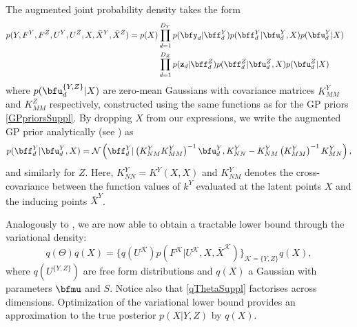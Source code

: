 
 
 The augmented joint probability density takes the form
 \begin{align}
 p(Y,F^Y, F^Z, U^Y, U^Z,X,\bar{X}^Y,\bar{X}^Z) =
    p(X) & \prod_{d=1}^{D_Y} p(\bfy_d | \bff^Y_d) p(\bff^Y_d | \bfu^Y_d, X) p(\bfu^Y_d | X)  & \nonumber \\
         & \prod_{d=1}^{D_Z} p(\mathbf{z}_d | \bff^Z_d) p(\bff^Z_d | \bfu^Z_d, X) p(\bfu^Z_d | X) \label{augmentedJointSuppl}
 \end{align}
 where $p(\bfu^{\{Y,Z\}}_d | X)$ are zero-mean Gaussians with
 covariance matrices $K^Y_{MM}$ and $K^Z_{MM}$ respectively, constructed using the same functions as for
 the GP priors \eqref{GPpriorsSuppl}. 
 By dropping $X$ from our
 expressions, we write the augmented GP prior analytically (see
 \cite{Rasmussen:book06}) as
 \begin{equation}
  \label{priorF2Suppl}
 p(\bff^Y_d | \bfu^Y_d, X) =  \mathcal{N}  \left( \bff^Y_d | \left(K^Y_{NM} K^Y_{MM}\right)^{-1}
	\bfu^Y_d , K^Y_{NN} - K^Y_{NM} \left(K^Y_{MM}\right)^{-1} K^Y_{MN} \right),
 \end{equation}
 and similarly for $Z$. Here, $K^Y_{NN} = K^Y(X,X)$ and $K^Y_{NM}$ denotes the cross-covariance between the function values of $k^Y$ evaluated at
the latent points $X$ and the inducing points $\bar{X}^Y$.

\noindent 
\par Analogously to \cite{Titsias:bayesGPLVM10}, we are now able to obtain a tractable lower bound through
the variational density:
\begin{equation}
\label{qThetaSuppl}
q(\Theta)q(X) = \{q(U^\mathcal{K}) p(F^\mathcal{K}|U^\mathcal{K},X,\bar{X}^\mathcal{K})\}_{\mathcal{K}=\{Y,Z\}} q(X),
\end{equation} 
where $q(U^{\{Y,Z\}})$ are free form distributions and $q(X)$ a Gaussian with parameters $\bfmu$ and $S$.
Notice also that \eqref{qThetaSuppl} factorises across dimensions.
Optimization of the variational lower bound provides an approximation to the true posterior $p(X|Y,Z)$
by $q(X)$. 

